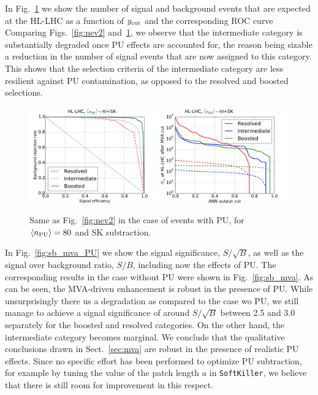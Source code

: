 In Fig.~\ref{fig:nev2_PU}
we show the number of signal and background events that
are expected at the HL-LHC as a function of
$y_{\rm cut}$ and the corresponding ROC curve
%
Comparing Figs.~\ref{fig:nev2} and~\ref{fig:nev2_PU}, we observe
that the intermediate category is substantially degraded once PU effects
are accounted for, the reason being  sizable
a reduction in the number of signal
events that are now assigned to this category.
%
This shows that the selection criteria
of the intermediate category are less
resilient against PU contamination,
as opposed to the resolved and boosted selections.

\begin{figure}[t]
  \begin{center}
    \includegraphics[width=0.49\textwidth]{plots/roc_SKPU80.pdf}
\includegraphics[width=0.49\textwidth]{plots/nev2_SKPU80.pdf}
\caption{\small Same as Fig.~\ref{fig:nev2} in the
case of events with PU, for
 $\left\langle n_{\rm PU}\right\rangle=80$ 
  and SK subtraction.
}
\label{fig:nev2_PU}
\end{center}
\end{figure}


In Fig.~\ref{fig:sb_mva_PU} we show the signal significance,
$S/\sqrt{B}$, as well as the signal over background ratio,
$S/B$, including now the effects of PU.
%
The corresponding results in the case without PU were shown in
Fig.~\ref{fig:sb_mva}.
%
As can be seen, the MVA-driven enhancement is robust in the
presence of PU.
%
While unsurprisingly there us a degradation as compared to the case wo PU,
we still manage to achieve a signal significance of
around $S/\sqrt{B}$ between 2.5 and 3.0
separately for the boosted and resolved
categories.
%
On the other hand, the intermediate category becomes marginal.
%
We conclude that the qualitative conclusions drawn in
Sect.~\ref{sec:mva} are robust in the presence
of realistic PU effects.
%
Since no specific effort has been performed to
optimize PU subtraction, for example by tuning the value
of the patch length $a$ in {\tt SoftKiller}, we believe that
there is
still room for improvement in this respect.


